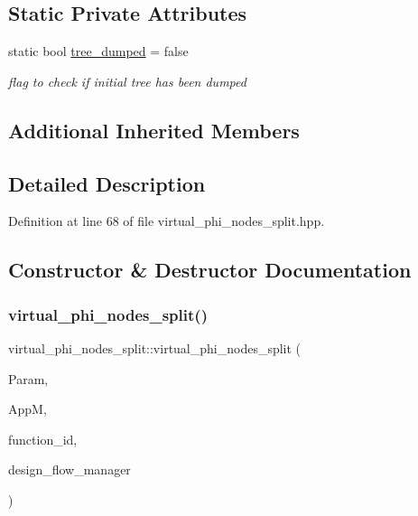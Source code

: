 \subsection*{Static Private Attributes}
\begin{DoxyCompactItemize}
\item 
static bool \hyperlink{classvirtual__phi__nodes__split_aaf6c14f3a8d83e8a2ad3f97d23337cf8}{tree\+\_\+dumped} = false
\begin{DoxyCompactList}\small\item\em flag to check if initial tree has been dumped \end{DoxyCompactList}\end{DoxyCompactItemize}
\subsection*{Additional Inherited Members}


\subsection{Detailed Description}


Definition at line 68 of file virtual\+\_\+phi\+\_\+nodes\+\_\+split.\+hpp.



\subsection{Constructor \& Destructor Documentation}
\mbox{\label{classvirtual__phi__nodes__split_a7cb1752917240fdf37059d635300d2b9}} 
\subsubsection{\texorpdfstring{virtual\+\_\+phi\+\_\+nodes\+\_\+split()}{virtual\_phi\_nodes\_split()}}
{\footnotesize\ttfamily virtual\+\_\+phi\+\_\+nodes\+\_\+split\+::virtual\+\_\+phi\+\_\+nodes\+\_\+split (\begin{DoxyParamCaption}\item[{const \hyperlink{Parameter_8hpp_a37841774a6fcb479b597fdf8955eb4ea}{Parameter\+Const\+Ref}}]{Param,  }\item[{const \hyperlink{application__manager_8hpp_a04ccad4e5ee401e8934306672082c180}{application\+\_\+manager\+Ref}}]{AppM,  }\item[{unsigned int}]{function\+\_\+id,  }\item[{const Design\+Flow\+Manager\+Const\+Ref}]{design\+\_\+flow\+\_\+manager }\end{DoxyParamCaption})}



